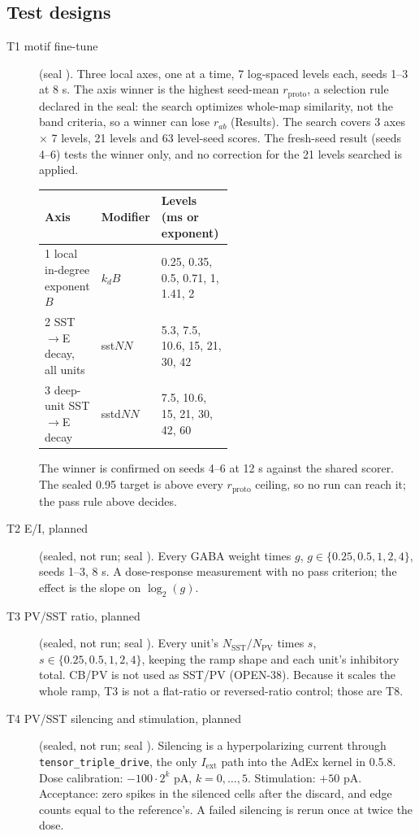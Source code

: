\subsection{Test designs}

\begin{description}
\item[T1 motif fine-tune] (seal ). Three local axes, one at a time, 7 log-spaced
levels each, seeds 1--3 at 8 s. The axis winner is the highest seed-mean $r_\text{proto}$, a selection rule
declared in the seal: the search optimizes whole-map similarity, not the band criteria, so a winner can lose
$r_{ab}$ (Results). The search covers 3 axes $\times$ 7 levels, 21 levels and 63 level-seed scores. The fresh-seed
result (seeds 4--6) tests the winner only, and no correction for the 21 levels searched is applied.

\begin{center}
\begin{tabular}{llp{0.5\linewidth}}
\toprule
Axis & Modifier & Levels (ms or exponent) \\
\midrule
1 local in-degree exponent $B$ & $k_dB$ & 0.25, 0.35, 0.5, 0.71, 1, 1.41, 2 \\
2 SST$\to$E decay, all units & sst$NN$ & 5.3, 7.5, 10.6, 15, 21, 30, 42 \\
3 deep-unit SST$\to$E decay & sstd$NN$ & 7.5, 10.6, 15, 21, 30, 42, 60 \\
\bottomrule
\end{tabular}
\end{center}

The winner is confirmed on seeds 4--6 at 12 s against the shared scorer. The sealed 0.95 target is above every
$r_\text{proto}$ ceiling, so no run can reach it; the pass rule above decides.

\item[T2 E/I, planned] (sealed, not run; seal ). Every GABA weight times $g$, $g \in \{0.25, 0.5, 1, 2, 4\}$,
seeds 1--3, 8 s. A dose-response measurement with no pass criterion; the effect is the slope on $\log_2(g)$.

\item[T3 PV/SST ratio, planned] (sealed, not run; seal ). Every unit's $N_\text{SST}/N_\text{PV}$ times $s$,
$s \in \{0.25, 0.5, 1, 2, 4\}$, keeping the ramp shape and each unit's inhibitory total. CB/PV is not used as SST/PV
(OPEN-38). Because it scales the whole ramp, T3 is not a flat-ratio or reversed-ratio control; those are T8.

\item[T4 PV/SST silencing and stimulation, planned] (sealed, not run; seal ). Silencing is a hyperpolarizing
current through \texttt{tensor\_triple\_drive}, the only $I_\text{ext}$ path into the AdEx kernel in 0.5.8.
Dose calibration: $-100 \cdot 2^k$ pA, $k = 0,\ldots,5$. Stimulation: $+50$ pA. Acceptance: zero spikes in the
silenced cells after the discard, and edge counts equal to the reference's. A failed silencing is rerun once at
twice the dose.


\end{description}

